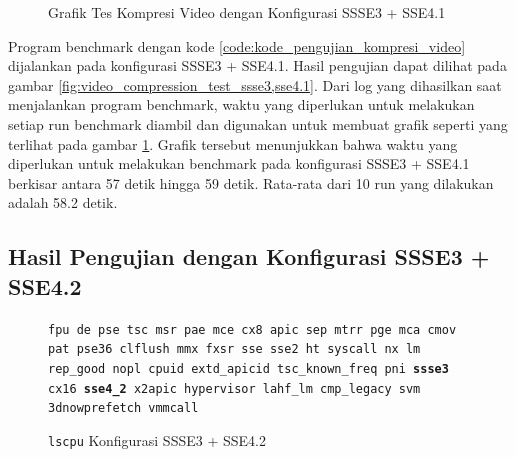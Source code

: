 \begin{figure}
    \centering
    \caption{Grafik Tes Kompresi Video dengan Konfigurasi SSSE3 + SSE4.1}
    \label{fig:video_compression_test_ssse3,sse4.1_graph}
\end{figure}

Program benchmark dengan kode \ref{code:kode_pengujian_kompresi_video} dijalankan pada konfigurasi SSSE3 + SSE4.1. Hasil pengujian dapat dilihat pada gambar \ref{fig:video_compression_test_ssse3,sse4.1}. Dari log yang dihasilkan saat menjalankan program benchmark, waktu yang diperlukan untuk melakukan setiap run benchmark diambil dan digunakan untuk membuat grafik seperti yang terlihat pada gambar \ref{fig:video_compression_test_ssse3,sse4.1_graph}. Grafik tersebut menunjukkan bahwa waktu yang diperlukan untuk melakukan benchmark pada konfigurasi SSSE3 + SSE4.1 berkisar antara 57 detik hingga 59 detik. Rata-rata dari 10 run yang dilakukan adalah 58.2 detik.

\subsection{Hasil Pengujian dengan Konfigurasi SSSE3 + SSE4.2}
\begin{figure}
    \texttt{fpu de pse tsc msr pae mce cx8 apic sep mtrr pge mca cmov pat pse36 clflush mmx fxsr sse sse2 ht syscall nx lm rep\_good nopl cpuid extd\_apicid tsc\_known\_freq pni \textbf{ssse3} cx16 \textbf{sse4\_2} x2apic hypervisor lahf\_lm cmp\_legacy svm 3dnowprefetch vmmcall}
    \caption{\texttt{lscpu} Konfigurasi SSSE3 + SSE4.2}
    \label{fig:lscpu_video_compression_test_ssse3,sse4.2}
\end{figure}

